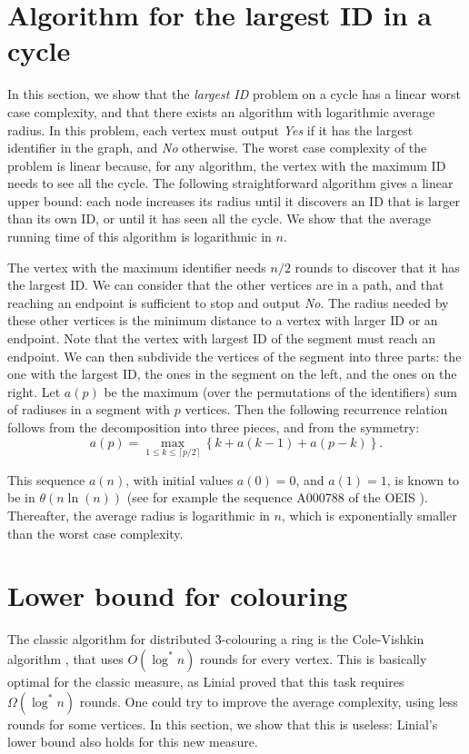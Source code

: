 \documentclass{sig-alternate-2013}
\begin{document}
\section{Algorithm for the largest ID in a cycle}

In this section, we show that the \emph{largest ID} problem on a cycle has a linear worst case complexity, and that there exists an algorithm with logarithmic average radius. In this problem, each vertex must output \emph{Yes} if it has the largest identifier in the graph, and \emph{No} otherwise. 
The worst case complexity of the problem is linear because, for any algorithm, the vertex with the maximum ID needs to see all the cycle. The following straightforward algorithm gives a linear upper bound: each node increases its radius until it discovers an ID that is larger than its own ID, or until it has seen all the cycle. We show that the average running time of this algorithm is logarithmic in $n$.

The vertex with the maximum identifier needs $n/2$ rounds to discover that it has the largest ID. We can consider that the other vertices are in a path, and that reaching an endpoint is sufficient to stop and output \emph{No}. 
The radius needed by these other vertices is the minimum distance to a vertex with larger ID or an endpoint. Note that the vertex with largest ID of the segment must reach an endpoint. We can then subdivide the vertices of the segment into three parts: the one with the largest ID, the ones in the segment on the left, and the ones on the right. Let $a(p)$ be the maximum (over the permutations of the identifiers) sum of radiuses in a segment with $p$ vertices. Then the following recurrence relation follows from the decomposition into three pieces, and from the symmetry:
$$a(p) = \max_{1 \leq k \leq \lceil p/2\rceil}\left\{ k + a(k-1) + a(p-k) \right\}.$$ 

This sequence $a(n)$, with initial values $a(0)=0$, and $a(1)=1$, is known to be in $\theta(n\ln(n))$ (see for example the sequence A000788 of the OEIS \cite{oeisA000788}). Thereafter, the average radius is logarithmic in $n$, which is exponentially smaller than the worst case complexity.

\section{Lower bound for colouring}
The classic algorithm for distributed 3-colouring a ring is the Cole-Vishkin algorithm \cite{ColeV86}, that uses $O(\log^*n)$ rounds for every vertex. This is basically optimal for the classic measure, as Linial proved that this task requires $\Omega(\log^*n)$ rounds\cite{Linial92}. One could try to improve the average complexity, using less rounds for some vertices. In this section, we show that this is useless: Linial's lower bound also holds for this new measure.
\end{document}
